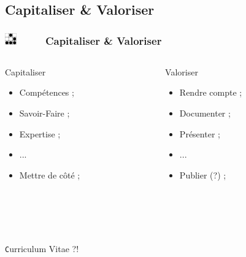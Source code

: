 \documentclass[slidetop,11pt]{beamer}
\def\sectionPartVe{Capitaliser \& Valoriser} %
\def\moreInFrameTitle{\includegraphics[height=0.5cm]{img/logo_glider.png}~~~~~}
\begin{document}
\subsection{\sectionPartVe}
\begin{frame}
	\frametitle{\moreInFrameTitle \sectionPartVe}
	
	\begin{columns}[T]
	\begin{column}[T]{5.50cm}
		\begin{beamerboxesrounded}	[lower=substructureUN, %
		 				 upper=block title UN,%
						 shadow=true]%
		       {Capitaliser}
			\begin{itemize}
				\item Comp{\'e}tences ; 
				\item Savoir-Faire ; 
				\item Expertise ; 
				\item ... 
				\item Mettre de c{\^o}t{\'e} ; 
			\end{itemize}
		\end{beamerboxesrounded}
	\end{column}
	\begin{column}[T]{5.50cm}
		\begin{beamerboxesrounded}	[lower=substructureTR, %
		 				 upper=block title TR,%
						 shadow=true]%
		       {Valoriser}
			\begin{itemize}
				\item Rendre compte ; 
				\item Documenter ; 
				\item Pr{\'e}senter ; 
				\item ... 
				\item Publier (?) ; %
			\end{itemize}
		\end{beamerboxesrounded}
	\end{column}
	\end{columns}~\\~\\~\\
	
	\begin{center}
		{\texttt Curriculum Vitae ?!}
	\end{center}
	
\end{frame}
\end{document}
